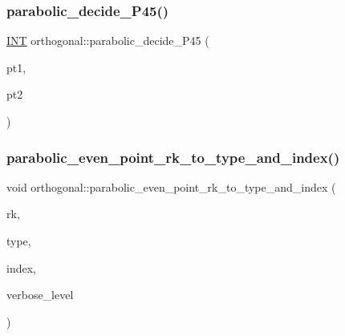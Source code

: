 \mbox{\label{classorthogonal_ae35e876043cbef583d29b82fd1c73bce}} 
\subsubsection{\texorpdfstring{parabolic\+\_\+decide\+\_\+\+P45()}{parabolic\_decide\_P45()}}
{\footnotesize\ttfamily \mbox{\hyperlink{galois_8h_a09fddde158a3a20bd2dcadb609de11dc}{I\+NT}} orthogonal\+::parabolic\+\_\+decide\+\_\+\+P45 (\begin{DoxyParamCaption}\item[{\mbox{\hyperlink{galois_8h_a09fddde158a3a20bd2dcadb609de11dc}{I\+NT}}}]{pt1,  }\item[{\mbox{\hyperlink{galois_8h_a09fddde158a3a20bd2dcadb609de11dc}{I\+NT}}}]{pt2 }\end{DoxyParamCaption})}

\mbox{\label{classorthogonal_ad0db009032dfb3899928cfc7d14fd6e6}} 
\subsubsection{\texorpdfstring{parabolic\+\_\+even\+\_\+point\+\_\+rk\+\_\+to\+\_\+type\+\_\+and\+\_\+index()}{parabolic\_even\_point\_rk\_to\_type\_and\_index()}}
{\footnotesize\ttfamily void orthogonal\+::parabolic\+\_\+even\+\_\+point\+\_\+rk\+\_\+to\+\_\+type\+\_\+and\+\_\+index (\begin{DoxyParamCaption}\item[{\mbox{\hyperlink{galois_8h_a09fddde158a3a20bd2dcadb609de11dc}{I\+NT}}}]{rk,  }\item[{\mbox{\hyperlink{galois_8h_a09fddde158a3a20bd2dcadb609de11dc}{I\+NT}} \&}]{type,  }\item[{\mbox{\hyperlink{galois_8h_a09fddde158a3a20bd2dcadb609de11dc}{I\+NT}} \&}]{index,  }\item[{\mbox{\hyperlink{galois_8h_a09fddde158a3a20bd2dcadb609de11dc}{I\+NT}}}]{verbose\+\_\+level }\end{DoxyParamCaption})}

